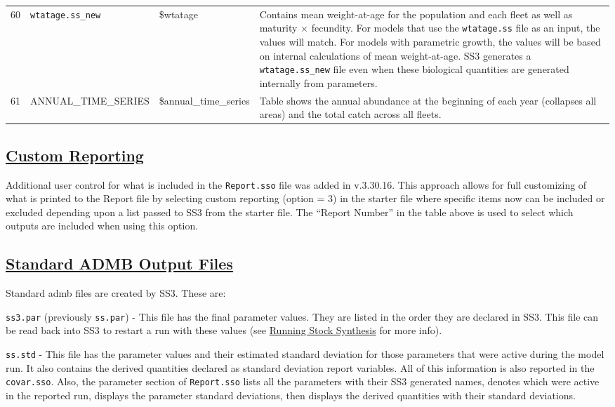\begin{landscape}
\begin{longtable}{p{1.5cm} p{5.5cm} >{\RaggedRight\arraybackslash}p{4.25cm} p{9.75cm}}
    60 & \texttt{wtatage.ss\_new} & \$wtatage & Contains mean weight-at-age for the population and each fleet as well as maturity $\times$ fecundity. For models that use the \texttt{wtatage.ss} file as an input, the values will match. For models with parametric growth, the values will be based on internal calculations of mean weight-at-age. SS3 generates a \texttt{wtatage.ss\_new} file even when these biological quantities are generated internally from parameters. \Bstrut\\
    61 & ANNUAL\_TIME\_SERIES & \$annual\_time\_series & Table shows the annual abundance at the beginning of each year (collapses all areas) and the total catch across all fleets. \\ 
    \hline
    \end{longtable}
\end{landscape}

\hypertarget{CustomReporting}{}
\subsection[Custom Reporting]{\protect\hyperlink{CustomReporting}{Custom Reporting}}
\hypertarget{custom}{} 
Additional user control for what is included in the \texttt{Report.sso} file was added in v.3.30.16. This approach allows for full customizing of what is printed to the Report file by selecting custom reporting (option = 3) in the starter file where specific items now can be included or excluded depending upon a list passed to SS3 from the starter file. The ``Report Number'' in the table above is used to select which outputs are included when using this option.

\hypertarget{ADMBOutput}{}
\subsection[Standard ADMB Output Files]{\protect\hyperlink{ADMBOutput}{Standard ADMB Output Files}}
Standard \gls{admb} files are created by SS3. These are:

\texttt{ss3.par} (previously \texttt{ss.par}) - This file has the final parameter values. They are listed in the order they are declared in SS3. This file can be read back into SS3 to restart a run with these values (see \hyperref[sec:RunningSS3]{Running Stock Synthesis} for more info).

\texttt{ss.std} - This file has the parameter values and their estimated standard deviation for those parameters that were active during the model run. It also contains the derived quantities declared as standard deviation report variables. All of this information is also reported in the \texttt{covar.sso}. Also, the parameter section of \texttt{Report.sso} lists all the parameters with their SS3 generated names, denotes which were active in the reported run, displays the parameter standard deviations, then displays the derived quantities with their standard deviations.

